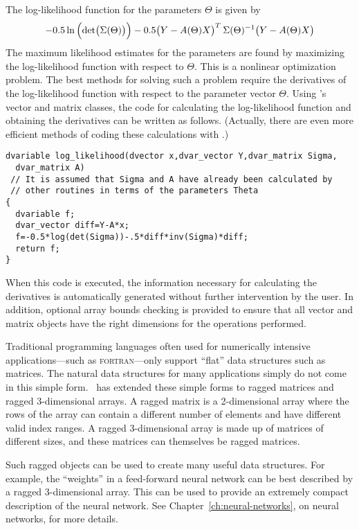 \documentclass{admbmanual}
\newcommand{\question}[1]{\bigskip\noindent{\bf #1?}\par\medskip\noindent}
\begin{document}
The log-likelihood function for the parameters $\Theta$
is given by
\begin{equation*}
  -0.5 \ln\Big(\mbox{\rm det}\big(\Sigma(\Theta)\big)\Big)-
   0.5\big(Y-A(\Theta)X\big)^T
   \,\Sigma(\Theta)^{-1}
   \big(Y-A(\Theta)X\big)
\end{equation*}
The maximum likelihood estimates for the parameters
are found by maximizing the
log-likelihood function with respect to $\Theta$. 
This is a nonlinear optimization problem. The best methods
for solving such a problem require the derivatives of
the log-likelihood function with respect to the parameter
vector $\Theta$. Using \scAD's vector and
matrix classes, the code for calculating the log-likelihood
function and obtaining the derivatives can be written as follows. 
(Actually, there are even more efficient methods of
coding these calculations with \scAD.)

\begin{lstlisting}
dvariable log_likelihood(dvector x,dvar_vector Y,dvar_matrix Sigma,
  dvar_matrix A)
 // It is assumed that Sigma and A have already been calculated by
 // other routines in terms of the parameters Theta
{
  dvariable f;
  dvar_vector diff=Y-A*x;
  f=-0.5*log(det(Sigma))-.5*diff*inv(Sigma)*diff;
  return f;
}
\end{lstlisting}

When this code is executed, the information necessary for  calculating
the 
derivatives is automatically generated without further intervention
by the user. In addition, optional array bounds checking is provided
to ensure that all vector and matrix objects have the right 
dimensions for the operations performed.


\question{What are ragged arrays}
Traditional programming languages often
used for numerically intensive applications---such as \textsc{fortran}---only support
 ``flat'' data structures such as matrices. The natural
data structures for many applications simply do not come in this
simple form.  \scAD\ has extended these simple forms to ragged matrices
and ragged 3-dimensional arrays.  A ragged matrix  is
a 2-dimensional array where the rows of the array can contain a 
different number of elements and have different valid index ranges.
A ragged 3-dimensional array is made up of matrices of different 
sizes, and these matrices can themselves be ragged matrices.

Such ragged objects can be used to create many useful data structures.
For example, the ``weights'' in a feed-forward neural network
can be best described by a ragged 3-dimensional array. This can be used to
provide an extremely compact description of the neural
network. See Chapter~\ref{ch:neural-networks}, on neural networks, for more details.
\end{document}
